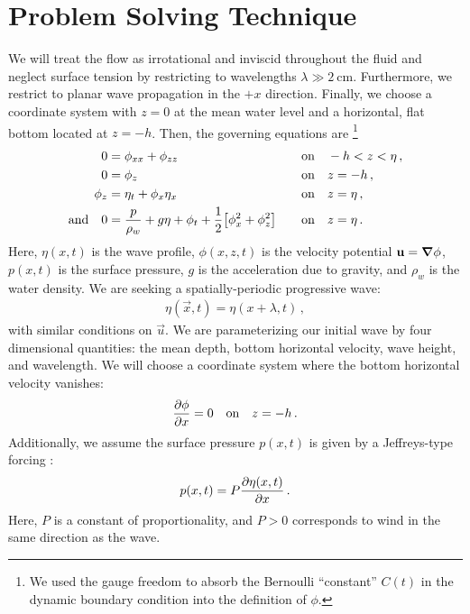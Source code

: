 \documentclass{jfm}
\begin{document}
\section{Problem Solving Technique}
We will treat the flow as irrotational and inviscid throughout the
fluid and neglect surface tension by restricting to wavelengths $\lambda
\gg \SI{2}{\centi\meter}$.
Furthermore, we restrict to planar wave propagation in the $+x$
direction.
Finally, we choose a coordinate system with $z=0$ at the mean water level and
a horizontal, flat bottom located at $z=-h$.
Then, the governing equations are%
\footnote{
  We used the gauge freedom to absorb the Bernoulli ``constant'' $C(t)$
  in the dynamic boundary condition into the definition of $\phi$.
}
\begin{alignat}{2}
  0 &= \phi_{xx} + \phi_{zz} &&\qq{on}
  -h < z < \eta \,, \label{eq:laplace}\\
  0 &= \phi_{z} &&\qq{on} z=-h \,, \label{eq:bottom_bc}\\
  \phi_{z} &= \eta_{t} + \phi_{x} \eta_{x} &&\qq{on} z = \eta \,,
  \label{eq:kinematic_bc}\\
  \qq*{and} 0 &= \frac{p}{\rho_w} + g\eta + \phi_{t} +
  \frac{1}{2} \bqty{\phi_{x}^2 + \phi_{z}^2} &&\qq{on} z=
  \eta \,. \label{eq:dynamic_bc}
\end{alignat}
Here, $\eta(x,t)$ is the wave profile, $\phi(x,z,t)$ is the velocity
potential $\mathbf{\bm{u}} = \grad{\phi}$, $p(x,t)$ is the surface pressure,
$g$ is the acceleration due to gravity, and $\rho_w$ is the water
density.
We are seeking a spatially-periodic progressive wave:
\begin{gather}
  \eta(\vec{x},t) = \eta(x + \lambda, t) \,,
\end{gather}
with similar conditions on $\vec{u}$.
We are parameterizing our initial wave by four dimensional quantities:
the mean depth, bottom horizontal velocity, wave height, and wavelength.
We will choose a coordinate system where the bottom horizontal velocity
vanishes:
\begin{equation}
  \pdv{\phi}{x} = 0 \qq{on} z=-h \,. \label{eq:bot_bc_horz}
\end{equation}
Additionally, we assume the surface pressure $p(x,t)$ is given by a
Jeffreys-type forcing \citep{jeffreys1925formation}:
\begin{equation}
  p(x,t) = P \pdv{\eta(x,t)}{x} \,.
\end{equation}
Here, $P$ is a constant of proportionality, and $P>0$ corresponds to
wind in the same direction as the wave.
\end{document}
